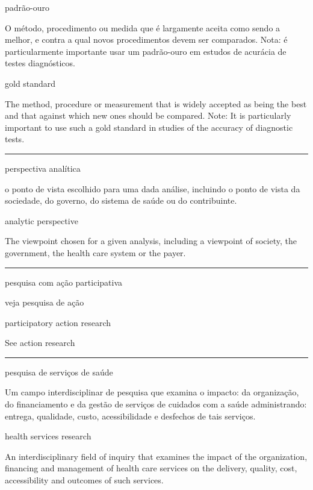 \documentclass[
  openany]{book}
\begin{document}
padrão-ouro

O método, procedimento ou medida que é largamente aceita como sendo a melhor, e contra a qual novos procedimentos devem ser comparados. Nota: é particularmente importante usar um padrão-ouro em estudos de acurácia de testes diagnósticos.

gold standard

The method, procedure or measurement that is widely accepted as being the best and that against which new ones should be compared. Note: It is particularly important to use such a gold standard in studies of the accuracy of diagnostic tests.

\begin{center}\rule{0.5\linewidth}{0.5pt}\end{center}

perspectiva analítica

o ponto de vista escolhido para uma dada análise, incluindo o ponto de vista da sociedade, do governo, do sistema de saúde ou do contribuinte.

analytic perspective

The viewpoint chosen for a given analysis, including a viewpoint of society, the government, the health care system or the payer.

\begin{center}\rule{0.5\linewidth}{0.5pt}\end{center}

pesquisa com ação participativa

veja pesquisa de ação

participatory action research

See action research

\begin{center}\rule{0.5\linewidth}{0.5pt}\end{center}

pesquisa de serviços de saúde

Um campo interdisciplinar de pesquisa que examina o impacto: da organização, do financiamento e da gestão de serviços de cuidados com a saúde administrando: entrega, qualidade, custo, acessibilidade e desfechos de tais serviços.

health services research

An interdisciplinary field of inquiry that examines the impact of the organization, financing and management of health care services on the delivery, quality, cost, accessibility and outcomes of such services.
\end{document}
